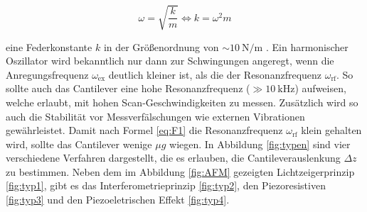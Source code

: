 \begin{equation}
  \omega = \sqrt{\frac{k}{m}}
  \iff
  k = \omega^2 m
  \label{eq:F1}
\end{equation}

\noindent
eine Federkonstante $k$ in der Größenordnung von $\sim\SI{10}{\newton\per\meter}$ \cite[157]{AFM}.
Ein harmonischer Oszillator wird bekanntlich nur dann zur Schwingungen angeregt,
wenn die Anregungsfrequenz $\omega_{\text{ex}}$ deutlich kleiner ist, als die
der Resonanzfrequenz $\omega_{\text{rf}}$. So sollte auch das Cantilever eine
hohe Resonanzfrequenz ($\gg \SI{10}{\kilo\hertz}$) aufweisen, welche erlaubt,
mit hohen Scan-Geschwindigkeiten zu messen. Zusätzlich wird so auch die Stabilität
vor Messverfälschungen wie externen Vibrationen gewährleistet. Damit nach Formel \ref{eq:F1}
die Resonanzfrequenz $\omega_{\text{rf}}$ klein gehalten wird, sollte das
Cantilever wenige $\mu g$ wiegen. In Abbildung \ref{fig:typen} sind vier verschiedene
Verfahren dargestellt, die es erlauben, die Cantileverauslenkung $\Delta z$ zu bestimmen.
Neben dem im Abbildung \ref{fig:AFM} gezeigten Lichtzeigerprinzip \ref{fig:typ1},
gibt es das Interferometrieprinzip \ref{fig:typ2}, den Piezoresistiven
\ref{fig:typ3} und den Piezoeletrischen Effekt \ref{fig:typ4}.


